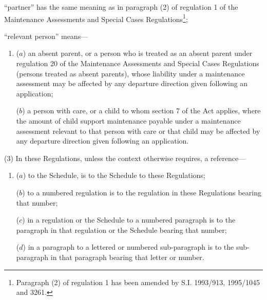 \documentclass[12pt,a4paper]{article}
\begin{document}
\begin{enumerate}
“partner” has the same meaning as in paragraph (2) of regulation 1 of the
Maintenance Assessments and Special Cases Regulations\footnote{\frenchspacing Paragraph (2) of regulation 1 has been amended by S.I. 1993/913, 1995/1045 and 3261.};

“relevant person” means—
\begin{enumerate}\item[]
($a$) an absent parent, or a person who is treated as an absent parent under
regulation 20 of the Maintenance Assessments and Special Cases Regulations
(persons treated as absent parents), whose liability under a maintenance
assessment may be affected by any departure direction given following an
application;

($b$) a person with care, or a child to whom section 7 of the Act applies, where
the amount of child support maintenance payable under a maintenance assessment
relevant to that person with care or that child may be affected by any departure
direction given following an application.
\end{enumerate}
\end{enumerate}

(3) In these Regulations, unless the context otherwise requires, a reference—
\begin{enumerate}\item[]
($a$) to the Schedule, is to the Schedule to these Regulations;

($b$) to a numbered regulation is to the regulation in these Regulations bearing
that number;

($c$) in a regulation or the Schedule to a numbered paragraph is to the paragraph
in that regulation or the Schedule bearing that number;

($d$) in a paragraph to a lettered or numbered sub-paragraph is to the
sub-paragraph in that paragraph bearing that letter or number.
\end{enumerate}

\end{document}
